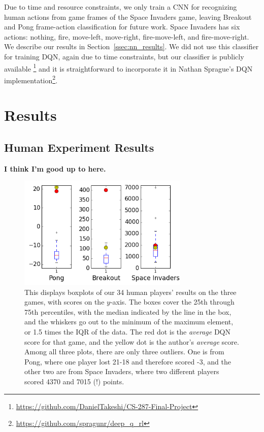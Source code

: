 \documentclass[letterpaper, 10 pt, conference]{ieeeconf}  %
\begin{document}
Due to time and resource constraints, we only train a CNN for recognizing human actions from game
frames of the Space Invaders game, leaving Breakout and Pong frame-action classification for future
work. Space Invaders has six actions: nothing, fire, move-left, move-right, fire-move-left, and
fire-move-right. We describe our results in Section~\ref{ssec:nn_results}. We did not use this
classifier for training DQN, again due to time constraints, but our classifier is publicly available
\footnote{\url{https://github.com/DanielTakeshi/CS-287-Final-Project}} and it is straightforward to
incorporate it in Nathan Sprague's DQN
implementation\footnote{\url{https://github.com/spragunr/deep_q_rl}}.


\section{Results}\label{sec:results}

\subsection{Human Experiment Results}\label{ssec:human_results}

\textbf{I think I'm good up to here.}

\begin{figure}[t]
\centering
\includegraphics[width=3.2in]{fig_boxplots_human_results.png}
\caption{This displays boxplots of our 34 human players' results on the three games, with scores on
the $y$-axis. The boxes cover the 25th through 75th percentiles, with the median indicated by the
line in the box, and the whiskers go out to the minimum of the maximum element, or 1.5 times the
IQR of the data. The red dot is the \emph{average} DQN score for that game, and the yellow dot is
the author's \emph{average} score. Among all three plots, there are only three outliers. One is from
Pong, where one player lost 21-18 and therefore scored -3, and the other two are from Space
Invaders, where two different players scored 4370 and 7015 (!) points.}
\label{fig:human_results}
\end{figure}
\end{document}
